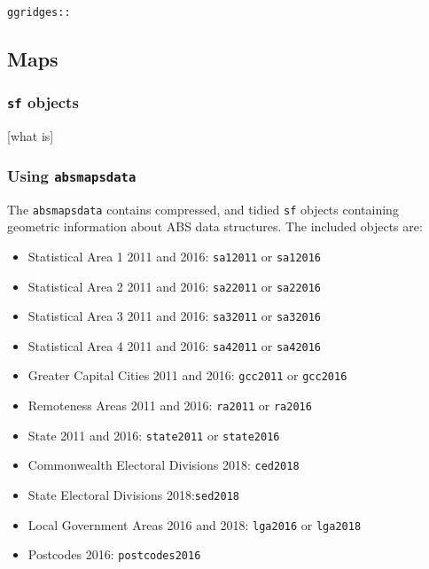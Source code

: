 \documentclass[]{book}
\providecommand{\tightlist}{%
  \setlength{\itemsep}{0pt}\setlength{\parskip}{0pt}}
\begin{document}
\texttt{ggridges::}

\hypertarget{maps}{%
\subsection{Maps}\label{maps}}

\hypertarget{sf-objects}{%
\subsubsection{\texorpdfstring{\texttt{sf} objects}{sf objects}}\label{sf-objects}}

{[}what is{]}

\hypertarget{using-absmapsdata}{%
\subsubsection{\texorpdfstring{Using \texttt{absmapsdata}}{Using absmapsdata}}\label{using-absmapsdata}}

The \texttt{absmapsdata} contains compressed, and tidied \texttt{sf} objects containing geometric information about ABS data structures. The included objects are:

\begin{itemize}
\tightlist
\item
  Statistical Area 1 2011 and 2016: \texttt{sa12011} or \texttt{sa12016}
\item
  Statistical Area 2 2011 and 2016: \texttt{sa22011} or \texttt{sa22016}
\item
  Statistical Area 3 2011 and 2016: \texttt{sa32011} or \texttt{sa32016}
\item
  Statistical Area 4 2011 and 2016: \texttt{sa42011} or \texttt{sa42016}
\item
  Greater Capital Cities 2011 and 2016: \texttt{gcc2011} or \texttt{gcc2016}
\item
  Remoteness Areas 2011 and 2016: \texttt{ra2011} or \texttt{ra2016}
\item
  State 2011 and 2016: \texttt{state2011} or \texttt{state2016}
\item
  Commonwealth Electoral Divisions 2018: \texttt{ced2018}
\item
  State Electoral Divisions 2018:\texttt{sed2018}
\item
  Local Government Areas 2016 and 2018: \texttt{lga2016} or \texttt{lga2018}
\item
  Postcodes 2016: \texttt{postcodes2016}
\end{itemize}
\end{document}
